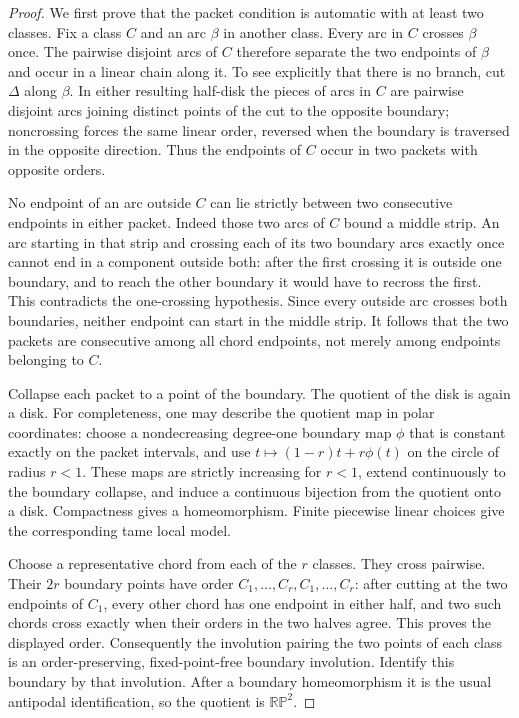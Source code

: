 \begin{proof}

We first prove that the packet condition is automatic with at least
two classes.  Fix a class $C$ and an arc $\beta$ in another class.
Every arc in $C$ crosses $\beta$ once.  The pairwise disjoint arcs of
$C$ therefore separate the two endpoints of $\beta$ and occur in a
linear chain along it.  To see explicitly that there is no branch,
cut $\Delta$ along $\beta$.  In either resulting half-disk the pieces
of arcs in $C$ are pairwise disjoint arcs joining distinct points of
the cut to the opposite boundary; noncrossing forces the same linear
order, reversed when the boundary is traversed in the opposite
direction.  Thus the endpoints of $C$ occur in two packets with
opposite orders.

No endpoint of an arc outside $C$ can lie strictly between two
consecutive endpoints in either packet.  Indeed those two arcs of
$C$ bound a middle strip.  An arc starting in that strip and crossing
each of its two boundary arcs exactly once cannot end in a component
outside both: after the first crossing it is outside one boundary,
and to reach the other boundary it would have to recross the first.
This contradicts the one-crossing hypothesis.  Since every outside
arc crosses both boundaries, neither endpoint can start in the
middle strip.  It follows that the two packets are consecutive among
all chord endpoints, not merely among endpoints belonging to $C$.

Collapse each packet to a point of the boundary.  The quotient of the
disk is again a disk.  For completeness, one may describe the quotient
map in polar coordinates: choose a nondecreasing degree-one boundary
map $\phi$ that is constant exactly on the packet intervals, and use
$t\mapsto (1-r)t+r\phi(t)$ on the circle of radius $r<1$.  These maps
are strictly increasing for $r<1$, extend continuously to the boundary
collapse, and induce a continuous bijection from the quotient onto a
disk.  Compactness gives a homeomorphism.  Finite piecewise linear
choices give the corresponding tame local model.

Choose a representative chord from each of the $r$ classes.  They
cross pairwise.  Their $2r$ boundary points have order
$C_1,\ldots,C_r,C_1,\ldots,C_r$: after cutting at the two endpoints
of $C_1$, every other chord has one endpoint in either half, and two
such chords cross exactly when their orders in the two halves agree.
This proves the displayed order.  Consequently the involution pairing
the two points of each class is an order-preserving, fixed-point-free
boundary involution.  Identify this boundary by that involution.
After a boundary homeomorphism it is the usual antipodal
identification, so the quotient is $\mathbb {RP}^2$.


\end{proof}
